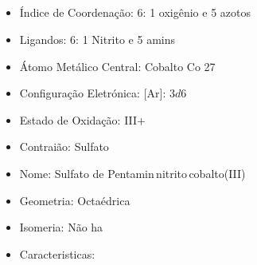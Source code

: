 \documentclass[12pt]{article}
\begin{document}
\break

	
	\subsection{}
	\begin{itemize}
   
   \item Índice de Coordenação: 6:
   	1 oxigênio  e
		5 azotos 
   
   
   \item Ligandos: 6:
   	1 Nitrito  e
		5 amins 

   
   
   \item Átomo Metálico Central: Cobalto Co 27
   
   \item Configuração Eletrónica: [Ar]: $3d6$
   
   \item Estado de Oxidação: III+
   
   \item Contraião: Sulfato 
   
   \item Nome: Sulfato de Pentamin\,nitrito\,cobalto(III)
   
   \item Geometria: Octaédrica
   
   \item Isomeria: Não ha

	\item Caracteristicas:

	\end{itemize}

\break


	
\end{document}
